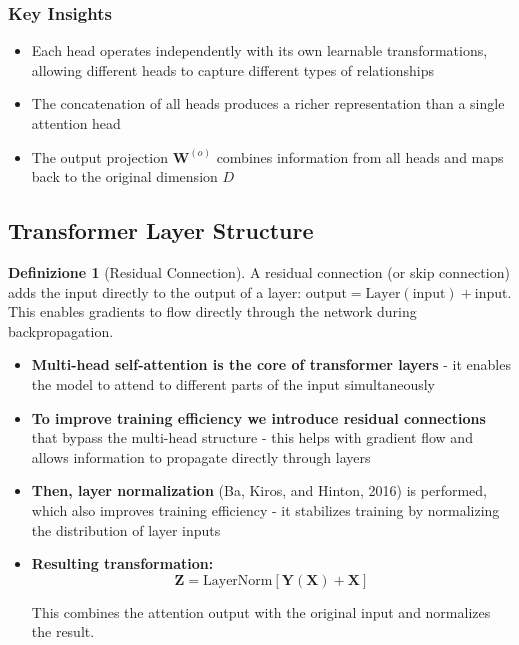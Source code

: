 \documentclass[11pt,a4paper]{article}
\theoremstyle{definition}
\newtheorem{definition}{Definizione}[section]
\theoremstyle{plain}
\theoremstyle{remark}
\begin{document}
\subsubsection{Key Insights}

\begin{itemize}
    \item Each head operates independently with its own learnable transformations, allowing different heads to capture different types of relationships
    \item The concatenation of all heads produces a richer representation than a single attention head
    \item The output projection $\mathbf{W}^{(o)}$ combines information from all heads and maps back to the original dimension $D$
\end{itemize}

\subsection{Transformer Layer Structure}

\begin{definition}[Residual Connection]
A residual connection (or skip connection) adds the input directly to the output of a layer: $\text{output} = \text{Layer}(\text{input}) + \text{input}$. This enables gradients to flow directly through the network during backpropagation.
\end{definition}

\begin{itemize}
    \item \textbf{Multi-head self-attention is the core of transformer layers} - it enables the model to attend to different parts of the input simultaneously
    
    \item \textbf{To improve training efficiency we introduce residual connections} that bypass the multi-head structure - this helps with gradient flow and allows information to propagate directly through layers
    
    \item \textbf{Then, layer normalization} (Ba, Kiros, and Hinton, 2016) is performed, which also improves training efficiency - it stabilizes training by normalizing the distribution of layer inputs
    
    \item \textbf{Resulting transformation:}
    \[
    \mathbf{Z} = \text{LayerNorm}[\mathbf{Y}(\mathbf{X}) + \mathbf{X}]
    \]
    
    This combines the attention output with the original input and normalizes the result.
\end{itemize}
\end{document}
